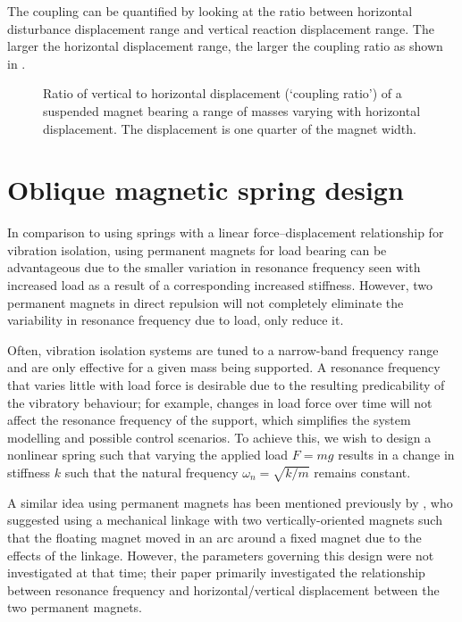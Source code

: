 The coupling can be quantified by looking at the ratio between horizontal
disturbance displacement range and vertical reaction displacement range. The
larger the horizontal displacement range, the larger the coupling ratio as
shown in .

\begin{figure}
  \caption{Ratio of vertical to horizontal displacement (`coupling ratio') of
  a suspended magnet bearing a range of masses varying with horizontal
  displacement. The displacement is one quarter of the magnet width.}
\end{figure}



\section{Oblique magnetic spring design}

In comparison to using springs with a linear force--displacement relationship for vibration isolation, using permanent magnets for load bearing can be advantageous due to the smaller variation in resonance frequency seen with increased load as a result of a corresponding increased stiffness.
However, two permanent magnets in direct repulsion will not completely eliminate the variability in resonance frequency due to load, only reduce it.

Often, vibration isolation systems are tuned to a narrow-band frequency range and are only effective for a given mass being supported.
A resonance frequency that varies little with load force is desirable due to the resulting predicability of the vibratory behaviour; for example, changes in load force over time will not affect the resonance frequency of the support, which simplifies the system modelling and possible control scenarios.
To achieve this, we wish to design a nonlinear spring such that varying the applied load $F=mg$ results in a change in stiffness $k$ such that the natural frequency $\omega_n=\sqrt{k/m}$ remains constant.

A similar idea using permanent magnets has been mentioned previously by \textcite{todaka2001-ietm}, who suggested using a mechanical linkage with two vertically-oriented magnets such that the floating magnet moved in an arc around a fixed magnet due to the effects of the linkage.
However, the parameters governing this design were not investigated at that time; their paper primarily investigated the relationship between resonance frequency and horizontal/vertical displacement between the two permanent magnets.

